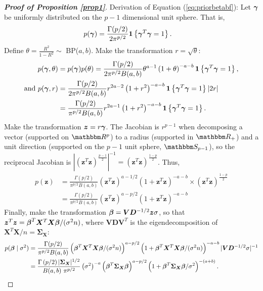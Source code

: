 \documentclass[12pt]{article}
\newcommand{\D}{{\bm  D}}
\newcommand{\V}{{\bm V}}
\newcommand{\X}{{\bm  X}}
\newcommand{\Xbf}{{\bm   X}}
\newcommand{\Sigmabf}{{\mathbf \Sigma}}
\newcommand{\zbf}{{\bm z}}
\newcommand{\onebf}{{\mathbf 1}}
\newcommand{\greekbold}[1]{\mbox{\boldmath $#1$}}
\newcommand{\betabf}{\greekbold{\beta}}
\newcommand{\gammabf}{\greekbold{\gamma}}
\newcommand{\R}{{R^2}}
\begin{document}
\begin{proof} [\textbf{Proof of Proposition \ref{prop1}}]
Derivation of Equation (\ref{eq:priorbetabf}):
Let $\gammabf$ be uniformly distributed on the $p-1$ dimensional unit sphere.
That is,
\begin{align*}
p(\gammabf) &= \frac{\Gamma(p/2)}{2\pi^{p/2}} \onebf\left\{ \gammabf^T\gammabf = 1 \right\}.
\end{align*}
Define $\theta = \frac{\R}{1-\R} \sim $ BP($a,b$).
Make the transformation $r = \sqrt{\theta}$:
\begin{align*}
p(\gammabf,\theta) &= p(\gammabf)p(\theta) = \frac{\Gamma(p/2)}{2\pi^{p/2}B(a,b)} \theta^{a-1} \left( 1+\theta \right)^{-a-b} \onebf\left\{ \gammabf^T\gammabf = 1 \right\}, \\ \text{and }
p(\gammabf,r) &= \frac{\Gamma(p/2)}{2\pi^{p/2}B(a,b)} r^{2a-2} \left( 1+r^2 \right)^{-a-b} \onebf\left\{ \gammabf^T\gammabf = 1 \right\} |2r|\\
&= \frac{\Gamma(p/2)}{\pi^{p/2}B(a,b)} r^{2a-1} \left( 1+r^2 \right)^{-a-b} \onebf\left\{ \gammabf^T\gammabf = 1 \right\}.
\end{align*}
Make the transformation $\zbf = r\gammabf$.
The Jacobian is $r^{p-1}$ when decomposing a vector (supported on $\mathbbm R^p$) to a radius (supported in $\mathbbm R_+$) and a unit direction (supported on the $p-1$ unit sphere, $\mathbbm S_{p-1}$), so the reciprocal Jacobian is  $|(\zbf^T\zbf)^{\frac{p-1}{2}}|^{-1} = (\zbf^T\zbf)^{\frac{1-p}{2}}$. Thus,
\begin{align*}
p(\zbf) &= \frac{\Gamma(p/2)}{\pi^{p/2}B(a,b)} (\zbf^T\zbf)^{a-1/2} \left( 1+\zbf^T\zbf \right)^{-a-b} \times  (\zbf^T\zbf)^{\frac{1-p}{2}}\\
&= \frac{\Gamma(p/2)}{\pi^{p/2}B(a,b)} (\zbf^T\zbf)^{a-p/2} \left( 1+\zbf^T\zbf \right)^{-a-b}
\end{align*}
Finally, make the transformation $\betabf = \V\D^{-1/2}\zbf \sigma $, so that $\zbf^T\zbf = \betabf^T\Xbf^T\Xbf\betabf /(\sigma^2n)$, where $\V\D\V^T$ is the eigendecomposition of $\X^T\X/n=\Sigmabf_\X$:
\begin{align*}
p(\betabf \mid \sigma^2) &= \frac{\Gamma(p/2)}{\pi^{p/2}B(a,b)} \left(\betabf^T\Xbf^T\Xbf\betabf /(\sigma^2n)\right)^{a-p/2} \left( 1+\betabf^T\Xbf^T\Xbf\betabf /(\sigma^2n) \right)^{-a-b}
|\V\D^{-1/2}\sigma|^{-1}\\
&= \frac{\Gamma\left( p/2\right)|\Sigmabf_\X|^{1/2} }{B(a,b)~\pi^{p/2}} \left(\sigma^2 \right)^{-a} \left( \betabf^T \Sigmabf_\X \betabf \right)^{a-p/2} \left(1 + \betabf^T \Sigmabf_\X \betabf /\sigma^2\right)^{-(a+b)}.
\end{align*}
\end{proof}
\end{document}
